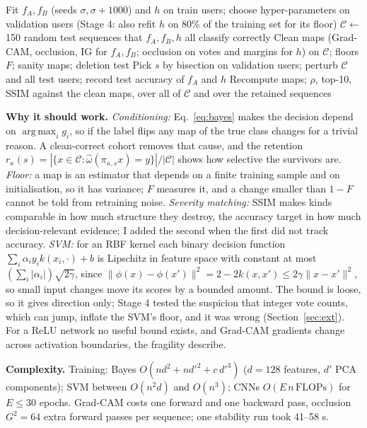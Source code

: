 \documentclass[11pt]{article}
\DeclareMathOperator*{\argmax}{arg\,max}
\begin{document}
\begin{algorithm}[!tb]
\caption{Attribution stability for one fold and repeat}\label{alg:stab}
\begin{algorithmic}[1]
\State Fit $f_A,f_B$ (seeds $\sigma,\sigma{+}1000$) and $h$ on train users; choose hyper-parameters on validation users (Stage 4: also refit $h$ on 80\% of the training set for its floor)
\State $\mathcal C\leftarrow$ 150 random test sequences that $f_A,f_B,h$ all classify correctly
\State Clean maps (Grad-CAM, occlusion, IG for $f_A,f_B$; occlusion on votes and margins for $h$) on $\mathcal C$; floors $F$; sanity maps; deletion test
  \State Pick $s$ by bisection on validation users; perturb $\mathcal C$ and all test users; record test accuracy of $f_A$ and $h$
  \State Recompute maps; $\rho$, top-10, SSIM against the clean maps, over all of $\mathcal C$ and over the retained sequences
\EndFor
\end{algorithmic}
\end{algorithm}

\textbf{Why it should work.} \emph{Conditioning:} Eq.~\eqref{eq:bayes} makes the decision depend on $\argmax_i g_i$, so if the label flips any map of the true class changes for a trivial reason. A clean-correct cohort removes that cause, and the retention $r_\kappa(s)=|\{x\in\mathcal C:\hat\omega(\pi_{\kappa,s}x)=y\}|/|\mathcal C|$ shows how selective the survivors are. \emph{Floor:} a map is an estimator that depends on a finite training sample and on initialisation, so it has variance; $F$ measures it, and a change smaller than $1-F$ cannot be told from retraining noise. \emph{Severity matching:} SSIM makes kinds comparable in how much structure they destroy, the accuracy target in how much decision-relevant evidence; I added the second when the first did not track accuracy. \emph{SVM:} for an RBF kernel each binary decision function $\sum_i\alpha_i y_i k(x_i,\cdot)+b$ is Lipschitz in feature space with constant at most $(\sum_i|\alpha_i|)\sqrt{2\gamma}$, since $\|\phi(x)-\phi(x')\|^2=2-2k(x,x')\le2\gamma\|x-x'\|^2$, so small input changes move its scores by a bounded amount. The bound is loose, so it gives direction only; Stage 4 tested the suspicion that integer vote counts, which can jump, inflate the SVM's floor, and it was wrong (Section~\ref{sec:ext}). For a ReLU network no useful bound exists, and Grad-CAM gradients change across activation boundaries, the fragility \citet{ghorbani2019fragile} describe.

\textbf{Complexity.} Training: Bayes $O(nd^2+nd'^2+c\,d'^3)$ ($d=128$ features, $d'$ PCA components); SVM between $O(n^2d)$ and $O(n^3)$; CNNs $O(E\,n\,\mathrm{FLOPs})$ for $E\le30$ epochs. Grad-CAM costs one forward and one backward pass, occlusion $G^2=64$ extra forward passes per sequence; one stability run took 41--58 s.
\end{document}
